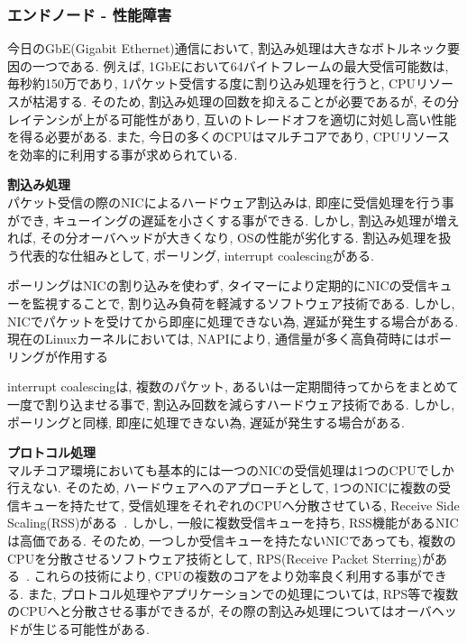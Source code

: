 \subsubsection{エンドノード - 性能障害}
今日のGbE(Gigabit Ethernet)通信において, 割込み処理は大きなボトルネック要因の一つである.
例えば, 1GbEにおいて64バイトフレームの最大受信可能数は, 毎秒約150万であり, 1パケット受信する度に割り込み処理を行うと,
CPUリソースが枯渇する.
そのため, 割込み処理の回数を抑えることが必要であるが, その分レイテンシが上がる可能性があり, 互いのトレードオフを適切に対処し高い性能を得る必要がある.
また, 今日の多くのCPUはマルチコアであり, CPUリソースを効率的に利用する事が求められている.

{\bf 割込み処理}\\
パケット受信の際のNICによるハードウェア割込みは, 即座に受信処理を行う事ができ, キューイングの遅延を小さくする事ができる.
しかし, 割込み処理が増えれば, その分オーバヘッドが大きくなり, OSの性能が劣化する.
割込み処理を扱う代表的な仕組みとして, ポーリング, interrupt coalescingがある.

ポーリングはNICの割り込みを使わず, タイマーにより定期的にNICの受信キューを監視することで, 割り込み負荷を軽減するソフトウェア技術である.
しかし, NICでパケットを受けてから即座に処理できない為, 遅延が発生する場合がある.
現在のLinuxカーネルにおいては, NAPIにより, 通信量が多く高負荷時にはポーリングが作用する~\cite{NAPI}

interrupt coalescingは, 複数のパケット, あるいは一定期間待ってからをまとめて一度で割り込ませる事で,
割込み回数を減らすハードウェア技術である.
しかし, ポーリングと同様, 即座に処理できない為, 遅延が発生する場合がある.

{\bf プロトコル処理}\\
マルチコア環境においても基本的には一つのNICの受信処理は1つのCPUでしか行えない.
そのため, ハードウェアへのアプローチとして, 1つのNICに複数の受信キューを持たせて, 受信処理をそれぞれのCPUへ分散させている, Receive
Side Scaling(RSS)がある~\cite{RSS}.
しかし, 一般に複数受信キューを持ち, RSS機能があるNICは高価である\cite{intel}.
そのため, 一つしか受信キューを持たないNICであっても, 複数のCPUを分散させるソフトウェア技術として, RPS(Receive Packet
Sterring)がある~\cite{RPS}.
これらの技術により, CPUの複数のコアをより効率良く利用する事ができる.
また, プロトコル処理やアプリケーションでの処理については, RPS等で複数のCPUへと分散させる事ができるが,
その際の割込み処理についてはオーバヘッドが生じる可能性がある.


